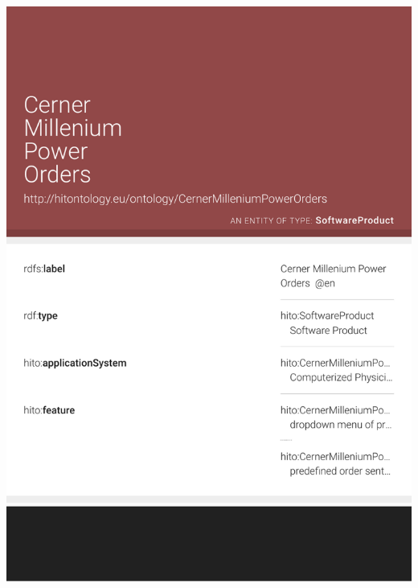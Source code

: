 \documentclass[aspectratio=1610,handout]{beamer}
\begin{document}
\begin{frame}[plain]
\begin{columns}
 \begin{column}{.55\textwidth}
  \centering\includegraphics[width=1.0\textwidth,height=1.0\textheight,keepaspectratio,trim=0 100 0 0,clip]{cernermillenium-lodview.pdf}
 \end{column}
\end{columns}
\end{frame}
\end{document}
